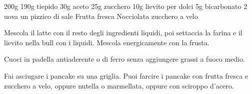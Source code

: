 \begin{ingreds}
	200g 
	190g  tiepido
	30g aceto
	25g zucchero
	10g lievito per dolci
	5g bicarbonato
	2 uova
	un pizzico di sale
\columnbreak
	Frutta fresca
	Nocciolata
	zucchero a velo
\end{ingreds}

\begin{method}
Mescola il latte con il resto degli ingredienti liquidi, poi settaccia la farina e il lievito nella bull con i liquidi. Mescola energicamente con la frusta.

Cuoci in padella antiaderente o di ferro senza aggiungere grassi a fuoco medio.

Fai asciugare i pancake su una griglia. Puoi farcire i pancake con frutta fresca e zucchero a velo, oppure nutella o marmellata, oppure con sciroppo d'acero.
\end {method}



